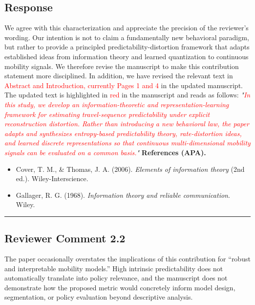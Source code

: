 \documentclass{NSF}
\begin{document}
\subsection{Response}
We agree with this characterization and appreciate the precision of the reviewer's wording. Our intention is not to claim a fundamentally new behavioral paradigm, but rather to provide a principled predictability-distortion framework that adapts established ideas from information theory and learned quantization to continuous mobility signals. We therefore revise the manuscript to make this contribution statement more disciplined.
\noindent In addition, we have revised the relevant text in \textcolor{red}{Abstract and Introduction, currently Pages 1 and 4} in the updated manuscript. The updated text is highlighted in \textcolor{red}{red} in the manuscript and reads as follows:
\vskip 0.1cm
\noindent \textit{"\textcolor{red}{In this study, we develop an information-theoretic and representation-learning framework for estimating travel-sequence predictability under explicit reconstruction distortion. Rather than introducing a new behavioral law, the paper adapts and synthesizes entropy-based predictability theory, rate-distortion ideas, and learned discrete representations so that continuous multi-dimensional mobility signals can be evaluated on a common basis.}"}
\vskip 0.05in
\noindent\textbf{References (APA).}
\begin{itemize}
    \item Cover, T. M., \& Thomas, J. A. (2006). \textit{Elements of information theory} (2nd ed.). Wiley-Interscience.
    \item Gallager, R. G. (1968). \textit{Information theory and reliable communication}. Wiley.
\end{itemize}

\noindent\rule{16.5cm}{1.0pt}

\subsection{Reviewer Comment 2.2}
\begin{mdframed}
The paper occasionally overstates the implications of this contribution for ``robust and interpretable mobility models.'' High intrinsic predictability does not automatically translate into policy relevance, and the manuscript does not demonstrate how the proposed metric would concretely inform model design, segmentation, or policy evaluation beyond descriptive analysis.
\end{mdframed}
\end{document}
